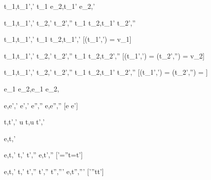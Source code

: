   {t_1,\sigma \stride t_1',\sigma'}
  {t_1 \Next e_2,\sigma \stride t_1' \Next e_2,\sigma'}


  {t_1,\sigma  \stride t_1',\sigma'  \Quad
   t_2,\sigma' \stride t_2',\sigma''}
  {t_1 \And t_2,\sigma \stride t_1' \And t_2',\sigma''}


  {t_1,\sigma  \stride t_1',\sigma'}
  {t_1 \Or t_2,\sigma \stride t_1',\sigma'}
  [\Value(t_1',\sigma') = v_1]

  {t_1,\sigma  \stride t_1',\sigma'  \Quad
   t_2,\sigma' \stride t_2',\sigma''}
  {t_1 \Or t_2,\sigma \stride t_2',\sigma''}
  [\Value(t_1',\sigma') = \bot \land \Value(t_2',\sigma'') = v_2]

  {t_1,\sigma  \stride t_1',\sigma'  \Quad
   t_2,\sigma' \stride t_2',\sigma''}
  {t_1 \Or t_2,\sigma \stride t_1' \Or t_2',\sigma''}
  [\Value(t_1',\sigma') = \bot \land \Value(t_2',\sigma'') = \bot]


  { }
  {e_1 \Xor e_2,\sigma \stride e_1 \Xor e_2,\sigma}

    {e,\sigma \evaluate e',\sigma'  \Quad
     e',\sigma' \stride e'',\sigma''}
    {e,\sigma \stride e'',\sigma''}
    [e \neq e']


  {t,\sigma\stride t',\sigma'}
  {u \At t,\sigma\stride u \At t',\sigma'}









  {e,\sigma \normalise t,\sigma'}


    {e,\sigma \evaluate t,\sigma'  \Quad
     t,\sigma' \stride t',\sigma''}
    {e,\sigma \normalise t',\sigma''}
    [\sigma'=\sigma''\wedge t=t']

    {e,\sigma \evaluate t,\sigma'  \Quad
     t,\sigma' \stride t',\sigma''  \Quad
     t',\sigma'' \normalise t'',\sigma'''}
    {e,\sigma \normalise t'',\sigma'''}
    [\sigma'\neq \sigma''\vee t\neq t']





